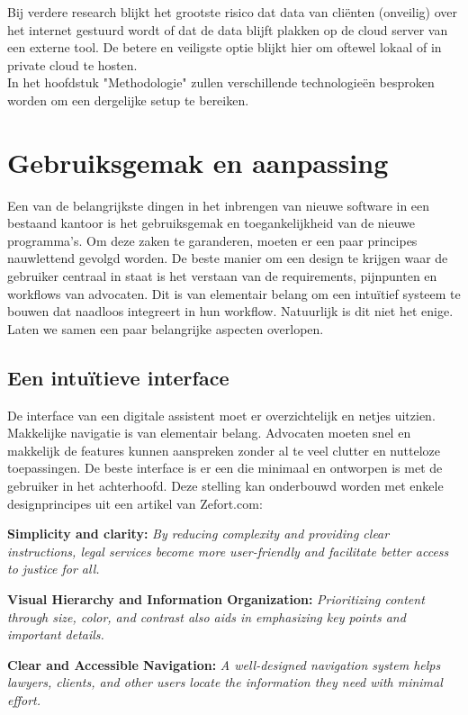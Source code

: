 Bij verdere research blijkt het grootste risico dat data van cliënten (onveilig) over het internet gestuurd wordt of dat de data blijft plakken op de cloud server van een externe tool.
De betere en veiligste optie blijkt hier om oftewel lokaal of in private cloud te hosten. 
\\In het hoofdstuk "Methodologie" zullen verschillende technologieën besproken worden om een dergelijke setup te bereiken.

\section{Gebruiksgemak en aanpassing}
Een van de belangrijkste dingen in het inbrengen van nieuwe software in een bestaand kantoor is het gebruiksgemak en toegankelijkheid van de nieuwe programma's. 
Om deze zaken te garanderen, moeten er een paar principes nauwlettend gevolgd worden. 
De beste manier om een design te krijgen waar de gebruiker centraal in staat is het verstaan van de requirements, pijnpunten en workflows van advocaten. 
Dit is van elementair belang om een intuïtief systeem te bouwen dat naadloos integreert in hun workflow. Natuurlijk is dit niet het enige.
Laten we samen een paar belangrijke aspecten overlopen.

\subsection{Een intuïtieve interface}
De interface van een digitale assistent moet er overzichtelijk en netjes uitzien. 
Makkelijke navigatie is van elementair belang.
Advocaten moeten snel en makkelijk de features kunnen aanspreken zonder al te veel clutter en nutteloze toepassingen. 
De beste interface is er een die minimaal en ontworpen is met de gebruiker in het achterhoofd. 
Deze stelling kan onderbouwd worden met enkele designprincipes uit een artikel van Zefort.com:

\begin{displayquote}
	\textbf{Simplicity and clarity:}
	\textit{By reducing complexity and providing clear instructions, legal services become more user-friendly and facilitate better access to justice for all.}
	\autocite{Zefort}

	\textbf{Visual Hierarchy and Information Organization:}
	\textit{Prioritizing content through size, color, and contrast also aids in emphasizing key points and important details.}
	\autocite{Zefort}

	\textbf{Clear and Accessible Navigation:}
	\textit{A well-designed navigation system helps lawyers, clients, and other users locate the information they need with minimal effort.}
	\autocite{Zefort}
\end{displayquote}

